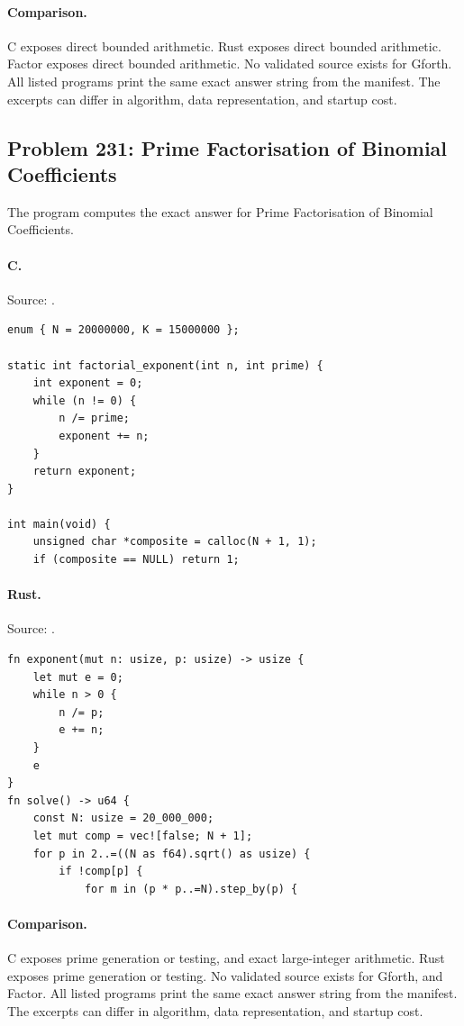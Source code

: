 \paragraph{Comparison.}
C exposes direct bounded arithmetic. Rust exposes direct bounded arithmetic. Factor exposes direct bounded arithmetic.
No validated source exists for Gforth.
All listed programs print the same exact answer string from the manifest. The excerpts can differ in algorithm, data representation, and startup cost.

\subsection{Problem 231: Prime Factorisation of Binomial Coefficients}
\label{walkthrough:p231}
The program computes the exact answer for Prime Factorisation of Binomial Coefficients.

\paragraph{C.} Source: .
\begin{lstlisting}
enum { N = 20000000, K = 15000000 };

static int factorial_exponent(int n, int prime) {
    int exponent = 0;
    while (n != 0) {
        n /= prime;
        exponent += n;
    }
    return exponent;
}

int main(void) {
    unsigned char *composite = calloc(N + 1, 1);
    if (composite == NULL) return 1;
\end{lstlisting}

\paragraph{Rust.} Source: .
\begin{lstlisting}
fn exponent(mut n: usize, p: usize) -> usize {
    let mut e = 0;
    while n > 0 {
        n /= p;
        e += n;
    }
    e
}
fn solve() -> u64 {
    const N: usize = 20_000_000;
    let mut comp = vec![false; N + 1];
    for p in 2..=((N as f64).sqrt() as usize) {
        if !comp[p] {
            for m in (p * p..=N).step_by(p) {
\end{lstlisting}

\paragraph{Comparison.}
C exposes prime generation or testing, and exact large-integer arithmetic. Rust exposes prime generation or testing.
No validated source exists for Gforth, and Factor.
All listed programs print the same exact answer string from the manifest. The excerpts can differ in algorithm, data representation, and startup cost.

